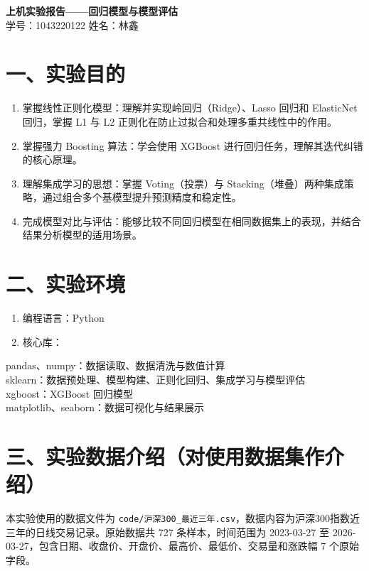 \documentclass[12pt,a4paper]{ctexart}
\begin{document}
\begin{center}
{\LARGE \textbf{上机实验报告——回归模型与模型评估}}\\[1em]
学号：1043220122 \hspace{2cm} 姓名：林鑫
\end{center}

\vspace{1em}

\section*{一、实验目的}
\begin{enumerate}[label=（\arabic*）]
\item 掌握线性正则化模型：理解并实现岭回归（Ridge）、Lasso 回归和 ElasticNet 回归，掌握 L1 与 L2 正则化在防止过拟合和处理多重共线性中的作用。
\item 掌握强力 Boosting 算法：学会使用 XGBoost 进行回归任务，理解其迭代纠错的核心原理。
\item 理解集成学习的思想：掌握 Voting（投票）与 Stacking（堆叠）两种集成策略，通过组合多个基模型提升预测精度和稳定性。
\item 完成模型对比与评估：能够比较不同回归模型在相同数据集上的表现，并结合结果分析模型的适用场景。
\end{enumerate}

\section*{二、实验环境}
\begin{enumerate}[label=（\arabic*）]
\item 编程语言：Python
\item 核心库：
\end{enumerate}

\noindent pandas、numpy：数据读取、数据清洗与数值计算\\
\noindent sklearn：数据预处理、模型构建、正则化回归、集成学习与模型评估\\
\noindent xgboost：XGBoost 回归模型\\
\noindent matplotlib、seaborn：数据可视化与结果展示

\section*{三、实验数据介绍（对使用数据集作介绍）}
本实验使用的数据文件为 \texttt{code/沪深300\_最近三年.csv}，数据内容为沪深300指数近三年的日线交易记录。原始数据共 727 条样本，时间范围为 2023-03-27 至 2026-03-27，包含日期、收盘价、开盘价、最高价、最低价、交易量和涨跌幅 7 个原始字段。
\end{document}
